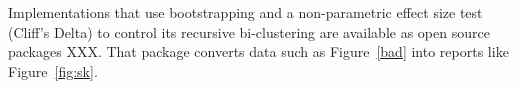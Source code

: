 \documentclass[preprint,10pt]{elsarticle}
\begin{document}
 
 Implementations that use bootstrapping and a non-parametric effect size test (Cliff's Delta) to control its recursive bi-clustering are available as open source packages
XXX.
 That package converts data such as Figure~\ref{bad} into reports like Figure~\ref{fig:sk}. 
 



 
\end{document}
